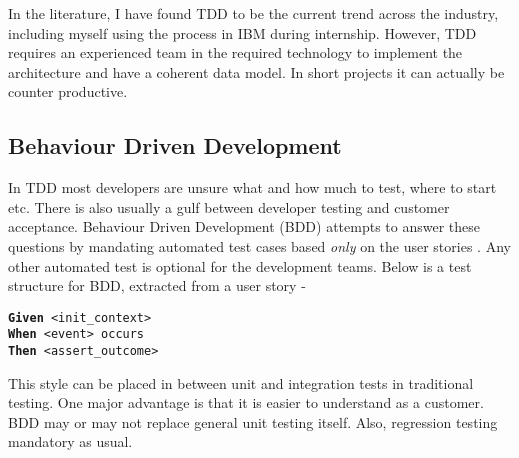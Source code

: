 In the literature, I have found TDD to be the current trend across the industry, including myself using the process in IBM during internship. However, TDD requires an experienced team in the required technology to implement the architecture and have a coherent data model. In short projects it can actually be counter productive.

\subsection{Behaviour Driven Development}

In TDD most developers are unsure what and how much to test, where to start etc. There is also usually a gulf between developer testing and customer acceptance. Behaviour Driven Development (BDD) attempts to answer these questions by mandating automated test cases based \textit{only} on the user stories \cite{Solis:2011}. Any other automated test is optional for the development teams. Below is a test structure for BDD, extracted from a user story - 

\begin{center}
\texttt{\textbf{Given} <init\_context>}\\
\texttt{\textbf{When} <event> occurs}\\
\texttt{\textbf{Then} <assert\_outcome>}
\end{center}

This style can be placed in between unit and integration tests in traditional testing. One major advantage is that it is easier to understand as a customer. BDD may or may not replace general unit testing itself. Also, regression testing mandatory as usual.